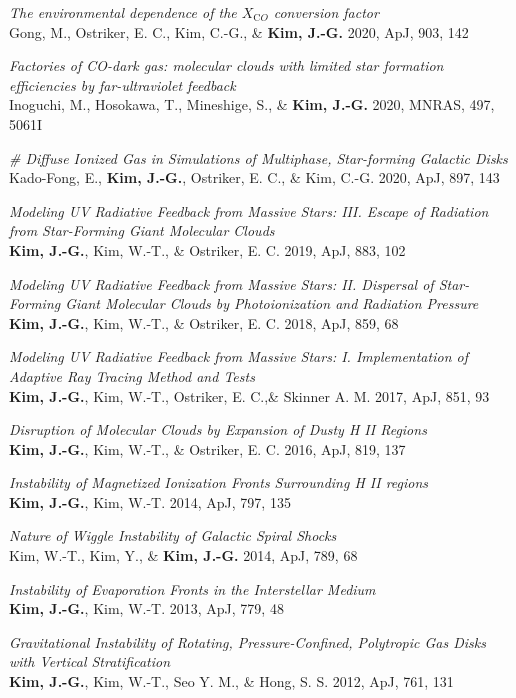 \begin{benumerate}{20}
\item \textit{The environmental dependence of the $X_{\mathrm CO}$ conversion
    factor}\\ Gong, M., Ostriker, E. C., Kim, C.-G., \& \textbf{Kim,
    J.-G.} 2020, ApJ, 903, 142 
\item \textit{Factories of CO-dark gas: molecular clouds with limited star
formation efficiencies by far-ultraviolet feedback} \\
  Inoguchi, M., Hosokawa, T., Mineshige, S., \& \textbf{Kim, J.-G.} 2020, MNRAS,
  497, 5061I
\item \textit{\# Diffuse Ionized Gas in Simulations of Multiphase, Star-forming
    Galactic Disks}\\
  Kado-Fong, E., \textbf{Kim, J.-G.}, Ostriker, E. C., \& Kim, C.-G. 2020, ApJ,
  897, 143
\item \textit{Modeling UV Radiative Feedback from Massive Stars: III. Escape
    of Radiation from Star-Forming Giant Molecular Clouds} \\ \textbf{Kim,
    J.-G.}, Kim, W.-T., \& Ostriker, E. C. 2019, ApJ, 883, 102
\item \textit{Modeling UV Radiative Feedback from Massive Stars: II. Dispersal
of Star-Forming Giant Molecular Clouds by Photoionization and Radiation
Pressure} \\ \textbf{Kim, J.-G.}, Kim, W.-T., \& Ostriker, E. C. 2018, ApJ, 859,
68
\item \textit{Modeling UV Radiative Feedback from Massive Stars: I.
Implementation of Adaptive Ray Tracing Method and Tests}\\ \textbf{Kim, J.-G.},
Kim, W.-T., Ostriker, E. C.,\& Skinner A. M. 2017, ApJ, 851, 93
\item \textit{Disruption of Molecular Clouds by Expansion of Dusty H II
Regions}\\ \textbf{Kim, J.-G.}, Kim, W.-T., \& Ostriker, E. C. 2016, ApJ, 819,
137
\item \textit{Instability of Magnetized Ionization Fronts Surrounding H II
regions}\\ \textbf{Kim, J.-G.}, Kim, W.-T. 2014, ApJ, 797, 135
\item \textit{Nature of Wiggle Instability of Galactic Spiral Shocks}\\ Kim,
W.-T., Kim, Y., \& \textbf{Kim, J.-G.} 2014, ApJ, 789, 68
\item \textit{Instability of Evaporation Fronts in the Interstellar Medium}\\
  \textbf{Kim, J.-G.}, Kim, W.-T. 2013, ApJ, 779, 48
\item \textit{Gravitational Instability of Rotating, Pressure-Confined,
    Polytropic Gas Disks with Vertical Stratification} \\ \textbf{Kim, J.-G.},
  Kim, W.-T., Seo Y. M., \& Hong, S. S. 2012, ApJ, 761, 131
\end{benumerate}

